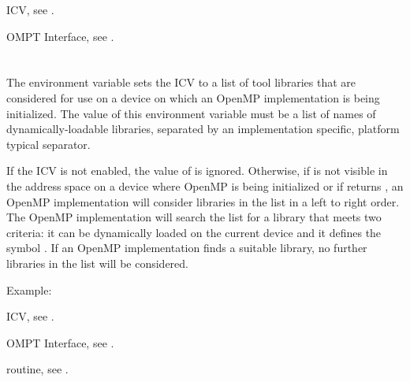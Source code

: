 \begin{crossrefs}
\item {} ICV, see .

\item OMPT Interface, see .
\end{crossrefs}



\section{}
\label{sec:OMP_TOOL_LIBRARIES}

The  environment variable sets the
 ICV to a list of tool libraries that are
considered for use on a device on which an OpenMP implementation
is being initialized. The value of this environment variable must
be a list of names of dynamically-loadable libraries, separated
by an implementation specific, platform typical separator.

If the  ICV is not enabled, the value of
 is ignored. Otherwise, if 
is not visible in the address space on a device where OpenMP is being
initialized or if  returns , an OpenMP
implementation will consider libraries in the  list
in a left to right order.  The OpenMP implementation will search the list for
a library that meets two criteria: it can be dynamically loaded on the
current device and it defines the symbol . If an
OpenMP implementation finds a suitable library, no further libraries in
the list will be considered.

Example:
\begin{ompEnv}
\end{ompEnv}

\begin{crossrefs}
\item {} ICV, see .

\item OMPT Interface, see .

\item {} routine, see .
\end{crossrefs}




